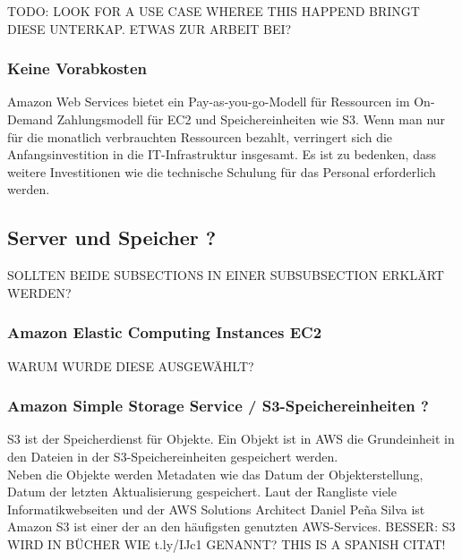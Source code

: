 TODO: LOOK FOR A USE CASE WHEREE THIS HAPPEND
BRINGT DIESE UNTERKAP. ETWAS ZUR ARBEIT BEI?


\subsubsection{Keine Vorabkosten}
Amazon Web Services bietet ein Pay-as-you-go-Modell für Ressourcen im On-Demand
Zahlungsmodell für EC2 und Speichereinheiten wie S3.
Wenn man nur für die monatlich verbrauchten Ressourcen bezahlt, verringert sich die Anfangsinvestition in die IT-Infrastruktur insgesamt. Es ist zu bedenken, dass weitere Investitionen wie die technische Schulung für das Personal erforderlich werden.


\subsection{Server und Speicher ?}
SOLLTEN BEIDE SUBSECTIONS IN EINER SUBSUBSECTION ERKLÄRT WERDEN?
\subsubsection{Amazon Elastic Computing Instances EC2 }
WARUM WURDE DIESE AUSGEWÄHLT?
\subsubsection{Amazon Simple Storage Service / S3-Speichereinheiten ?}
S3 ist der Speicherdienst für Objekte. Ein Objekt ist in AWS die Grundeinheit in den Dateien in der S3-Speichereinheiten gespeichert werden.
\\
Neben die Objekte werden Metadaten wie das Datum der Objekterstellung, Datum der letzten Aktualisierung gespeichert.
Laut der Rangliste viele Informatikwebseiten und der AWS Solutions Architect Daniel Peña Silva{\cite{STA1}} ist Amazon S3 ist einer der an den häufigsten genutzten AWS-Services. BESSER: S3 WIRD IN BÜCHER WIE t.ly/IJc1 GENANNT? THIS IS A SPANISH CITAT!


